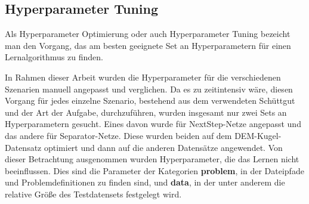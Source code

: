 \subsection{Hyperparameter Tuning}








Als Hyperparameter Optimierung oder auch Hyperparameter Tuning bezeicht man den Vorgang, das am besten geeignete Set an 
Hyperparametern für einen Lernalgorithmus zu finden.

In Rahmen dieser Arbeit wurden die Hyperparameter für die verschiedenen Szenarien manuell angepasst und verglichen.
Da es zu zeitintensiv wäre, diesen Vorgang für jedes einzelne Szenario, bestehend aus dem verwendeten Schüttgut und der Art der Aufgabe, durchzuführen,
wurden insgesamt nur zwei Sets an Hyperparametern gesucht.
Eines davon wurde für NextStep-Netze angepasst und das andere für Separator-Netze.
Diese wurden beiden auf dem DEM-Kugel-Datensatz optimiert und dann auf die anderen Datensätze angewendet.
Von dieser Betrachtung ausgenommen wurden Hyperparameter, die das Lernen nicht beeinflussen.
Dies sind die Parameter der Kategorien {\sffamily \textbf{problem}}, in der Dateipfade und Problemdefinitionen zu finden sind, 
und {\sffamily \textbf{data}}, in der unter anderem die relative Größe des Testdatensets festgelegt wird.


